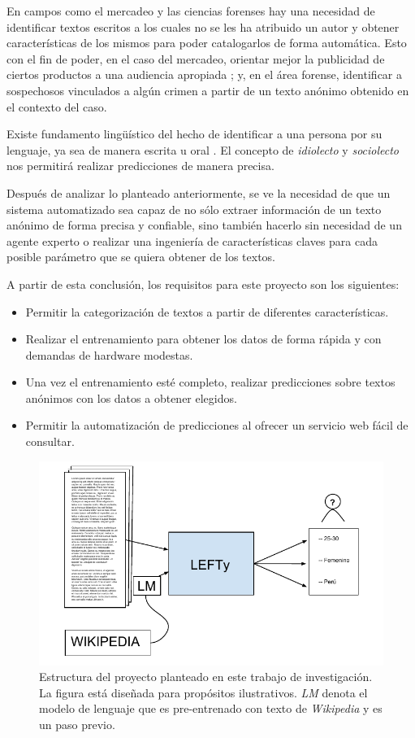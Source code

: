 En campos como el mercadeo y las ciencias forenses hay una necesidad de identificar textos escritos a los cuales no se les ha atribuido un autor y obtener características de los mismos para poder catalogarlos de forma automática. Esto con el fin de poder, en el caso del mercadeo, orientar mejor la publicidad de ciertos productos a una audiencia apropiada \parencite{aggarwal2012mining}; y, en el área forense, identificar a sospechosos vinculados a algún crimen a partir de un texto anónimo obtenido en el contexto del caso.

Existe fundamento lingüístico del hecho de identificar a una persona por su lenguaje, ya sea de manera escrita u oral \parencite{coulthard2004author, louwerse2004semantic}. El concepto de \textit{\gls{idiolecto}} y \textit{\gls{sociolecto}} nos permitirá realizar predicciones de manera precisa.

Después de analizar lo planteado anteriormente, se ve la necesidad de que un sistema automatizado sea capaz de no sólo extraer información de un texto anónimo de forma precisa y confiable, sino también hacerlo sin necesidad de un agente experto o realizar una ingeniería de características claves para cada posible parámetro que se quiera obtener de los textos.

A partir de esta conclusión, los requisitos para este proyecto son los siguientes:

\begin{itemize}
\item Permitir la categorización de textos a partir de diferentes características.
\item Realizar el entrenamiento para obtener los datos de forma rápida y con demandas de hardware modestas.
\item Una vez el entrenamiento esté completo, realizar predicciones sobre textos anónimos con los datos a obtener elegidos.
\item Permitir la automatización de predicciones al ofrecer un servicio web fácil de consultar.
\end{itemize}

\begin{figure}
\includegraphics[scale=1.0]{Figures/projectstruct.pdf}
\caption{Estructura del proyecto planteado en este trabajo de investigación. La figura está diseñada para propósitos ilustrativos. \textit{LM} denota el modelo de lenguaje que es pre-entrenado con texto de \textit{Wikipedia} y es un paso previo.}
\label{fig:projstruct}
\end{figure}

